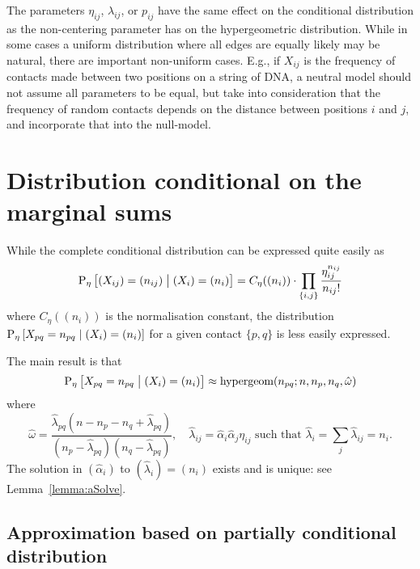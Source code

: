 \documentclass{myaptpub}%
\newcommand\Prob{\sP}
\newcommand\ProbSub[1]{#1}
\newcommand\ProbDist[1]{\Prob_{\ProbSub{#1}}}
\newcommand\Prs[2]{\ProbDist{#1}\left[#2\right]}%
\newcommand\bigmid{\bigm|}
\begin{document}
The parameters $\eta_{ij}$, $\lambda_{ij}$, or $p_{ij}$ have the same effect on the conditional distribution as the non-centering parameter has on the hypergeometric distribution. While in some cases a uniform distribution where all edges are equally likely may be natural, there are important non-uniform cases. E.g., if $X_{ij}$ is the frequency of contacts made between two positions on a string of DNA, a neutral model should not assume all parameters to be equal, but take into consideration that the frequency of random contacts depends on the distance between positions $i$ and $j$, and incorporate that into the null-model.


\section{Distribution conditional on the marginal sums}

While the complete conditional distribution can be expressed quite easily as
\begin{equation}\nonumber
\Prs{\eta}{(X_{ij})=(n_{ij})\bigmid(X_i)=(n_i)}
=C_{\ProbSub{\eta}}((n_i))\cdot\prod_{\{i,j\}}\frac{\eta_{ij}^{n_{ij}}}{n_{ij}!}
\end{equation}
where $C_{\ProbSub{\eta}}((n_i))$ is the normalisation constant, the distribution $\Prs{\eta}{X_{pq}=n_{pq}\mid(X_i)=(n_i)}$ for a given contact $\{p,q\}$ is less easily expressed.

The main result is that
\begin{equation}\label{eq:approx}
\Prs{\eta}{X_{pq}=n_{pq}\bigmid(X_i)=(n_i)}\approx\textrm{hypergeom}(n_{pq};n,n_p,n_q,\hat\omega)
\end{equation}
where
\begin{equation}\label{eq:omegahat}
\hat\omega=\frac{\hat\lambda_{pq}(n-n_p-n_q+\hat\lambda_{pq})}{(n_p-\hat\lambda_{pq})(n_q-\hat\lambda_{pq})},
\quad
\hat\lambda_{ij}=\hat\alpha_i\hat\alpha_j\eta_{ij}
\text{ such that }
\hat\lambda_i=\sum_j\hat\lambda_{ij}=n_i.
\end{equation}
The solution in $(\hat\alpha_i)$ to $(\hat\lambda_i)=(n_i)$ exists and is unique: see Lemma~\ref{lemma:aSolve}.

\subsection{Approximation based on partially conditional distribution}
\end{document}

